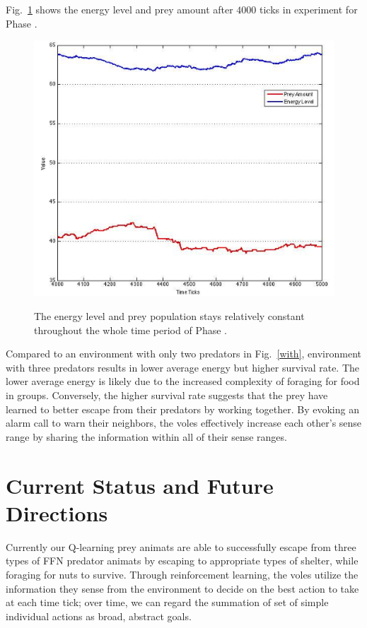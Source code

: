 \documentclass[10pt,conference,letterpaper,doublecolumn]{IEEEtran}
\begin{document}
Fig.~\ref{p32} shows the energy level and prey amount after $4000$ ticks in experiment for Phase \uppercase\expandafter{}.
\begin{figure}[H]
  \centering
  \includegraphics[scale=0.35]{p3.png} \\
  \caption{The energy level and prey population stays relatively constant throughout the whole time period of Phase \uppercase\expandafter{}.}
  \label{p32}
\end{figure}
Compared to an environment with only two predators in Fig.~\ref{with}, environment with three predators results in lower average energy but higher survival rate. The lower average energy is likely due to the increased complexity of foraging for food in groups. Conversely, the higher survival rate suggests that the prey have learned to better escape from their predators by working together. By evoking an alarm call to warn their neighbors, the voles effectively increase each other’s sense range by sharing the information within all of their sense ranges.
\section{Current Status and Future Directions}
Currently our Q-learning prey animats are able to successfully escape from three types of FFN predator animats by escaping to appropriate types of shelter, while foraging for nuts to survive. Through reinforcement learning, the voles utilize the information they sense from the environment to decide on the best action to take at each time tick; over time, we can regard the summation of set of simple individual actions as broad, abstract goals.
\end{document}
